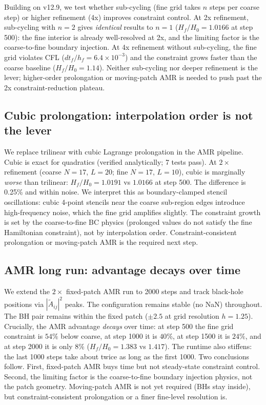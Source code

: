 Building on v12.9, we test whether sub-cycling (fine grid takes $n$ steps per coarse step) or higher refinement (4x) improves constraint control. At 2x refinement, sub-cycling with $n=2$ gives \emph{identical} results to $n=1$ ($H_f/H_0 = 1.0166$ at step 500): the fine interior is already well-resolved at 2x, and the limiting factor is the coarse-to-fine boundary injection. At 4x refinement without sub-cycling, the fine grid violates CFL ($dt_f/h_f = 6.4\times 10^{-3}$) and the constraint grows faster than the coarse baseline ($H_f/H_0 = 1.14$). Neither sub-cycling nor deeper refinement is the lever; higher-order prolongation or moving-patch AMR is needed to push past the 2x constraint-reduction plateau.

\subsection{Cubic prolongation: interpolation order is not the lever}

We replace trilinear with cubic Lagrange prolongation in the AMR pipeline. Cubic is exact for quadratics (verified analytically; 7 tests pass). At $2\times$ refinement (coarse $N=17$, $L=20$; fine $N=17$, $L=10$), cubic is marginally \emph{worse} than trilinear: $H_f/H_0 = 1.0191$ vs $1.0166$ at step 500. The difference is 0.25\% and within noise. We interpret this as boundary-clamped stencil oscillations: cubic 4-point stencils near the coarse sub-region edges introduce high-frequency noise, which the fine grid amplifies slightly. The constraint growth is set by the coarse-to-fine BC physics (prolonged values do not satisfy the fine Hamiltonian constraint), not by interpolation order. Constraint-consistent prolongation or moving-patch AMR is the required next step.

\subsection{AMR long run: advantage decays over time}

We extend the $2\times$ fixed-patch AMR run to 2000 steps and track black-hole positions via $|\tilde A_{ij}|^2$ peaks. The configuration remains stable (no NaN) throughout. The BH pair remains within the fixed patch ($\pm 2.5$ at grid resolution $h=1.25$). Crucially, the AMR advantage \emph{decays} over time: at step 500 the fine grid constraint is $54\%$ below coarse, at step 1000 it is $40\%$, at step 1500 it is $24\%$, and at step 2000 it is only $8\%$ ($H_f/H_0 = 1.383$ vs $1.417$). The runtime also stiffens: the last 1000 steps take about twice as long as the first 1000. Two conclusions follow. First, fixed-patch AMR buys time but not steady-state constraint control. Second, the limiting factor is the coarse-to-fine boundary injection physics, not the patch geometry. Moving-patch AMR is not yet required (BHs stay inside), but constraint-consistent prolongation or a finer fine-level resolution is.

